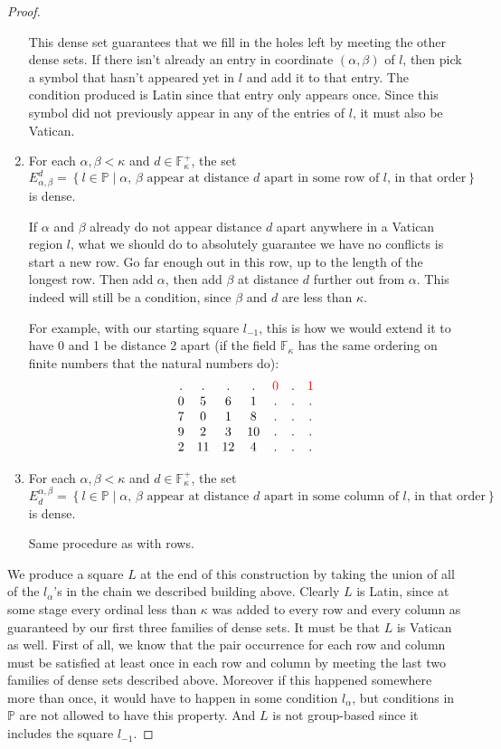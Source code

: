 \documentclass[12pt,a4paper]{article}
\newcommand{\F}{\mathbb{F}}
\newcommand{\st}{\; | \;}
\newcommand{\set}[2]{\left\{#1\st #2 \right\}}
\renewcommand{\P}{\mathbb{P}}
\begin{document}
\begin{proof}
\begin{enumerate}
	This dense set guarantees that we fill in the holes left by meeting the other dense sets. If there isn't already an entry in coordinate $(\alpha, \beta)$ of $l$, then pick a symbol that hasn't appeared yet in $l$ and add it to that entry. The condition produced is Latin since that entry only appears once. Since this symbol did not previously appear in any of the entries of $l$, it must also be Vatican.
	
	\item For each $\alpha, \beta<\kappa$ and $d \in \F_\kappa^+$, the set $$E^d_{\alpha, \beta}=\set{l \in \P}{\text{$\alpha$, $\beta$ appear at distance $d$ apart in some row of $l$, in that order}}$$ is dense.
	
	If $\alpha$ and $\beta$ already do not appear distance $d$ apart anywhere in a Vatican region $l$, what we should do to absolutely guarantee we have no conflicts is start a new row. Go far enough out in this row, up to the length of the longest row. Then add $\alpha$, then add $\beta$ at distance $d$ further out from $\alpha$. This indeed will still be a condition, since $\beta$ and $d$ are less than $\kappa$.
	
	For example, with our starting square $l_{-1}$, this is how we would extend it to have 0 and 1 be distance 2 apart (if the field $\F_\kappa$ has the same ordering on finite numbers that the natural numbers do):
$$\begin{array}{ccccccc}
	. &.  &.  & . & \color{red}0 & . &\color{red}1\\
	0 & 5 & 6 & 1 &. &. &. \\ 
	7 &  0 & 1 & 8 &. &. &.  \\
	9 & 2 & 3 & 10 &. &. &. \\
	2 & 11 & 12 & 4 &. &. &. 
\end{array}$$
	
	\item For each $\alpha, \beta<\kappa$ and $d \in \F_\kappa^+$, the set $$E_d^{\alpha, \beta}=\set{l \in \P}{\text{$\alpha$, $\beta$ appear at distance $d$ apart in some column of $l$, in that order}}$$ is dense.
	
	Same procedure as with rows.
	

\end{enumerate}

We produce a square $L$ at the end of this construction by taking the union of all of the $l_\alpha$'s in the chain we described building above. Clearly $L$ is Latin, since at some stage every ordinal less than $\kappa$ was added to every row and every column as guaranteed by our first three families of dense sets. It must be that $L$ is Vatican as well. First of all, we know that the pair occurrence for each row and column must be satisfied at least once in each row and column by meeting the last two families of dense sets described above. Moreover if this happened somewhere more than once, it would have to happen in some condition $l_\alpha$, but conditions in $\P$ are not allowed to have this property. And $L$ is not
group-based since it includes the square $l_{-1}$.
\end{proof}
\end{document}
